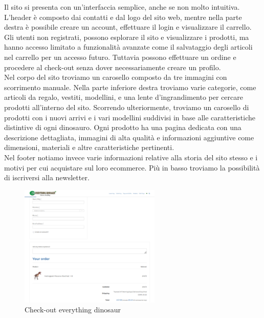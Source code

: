 Il sito si presenta con un'interfaccia semplice, anche se non molto intuitiva. L'header è composto dai contatti e dal logo del sito web, mentre nella parte destra è possibile creare un account, effettuare il login e visualizzare il carrello. Gli utenti non registrati, possono esplorare il sito e visualizzare i prodotti, ma hanno accesso limitato a funzionalità avanzate come il salvataggio degli articoli nel carrello per un accesso futuro. Tuttavia possono effettuare un ordine e procedere al check-out senza dover necessariamente creare un profilo.
\\
Nel corpo del sito troviamo un carosello composto da tre immagini con scorrimento manuale. Nella parte inferiore destra troviamo varie categorie, come articoli da regalo, vestiti, modellini, e una lente d'ingrandimento per cercare prodotti all'interno del sito. Scorrendo ulteriormente, troviamo un carosello di prodotti con i nuovi arrivi e i vari modellini suddivisi in base alle caratteristiche distintive di ogni dinosauro. Ogni prodotto ha una pagina dedicata con una descrizione dettagliata, immagini di alta qualità e informazioni aggiuntive come dimensioni, materiali e altre caratteristiche pertinenti. 
\\
Nel footer notiamo invece varie informazioni relative alla storia del sito stesso e i motivi per cui acquistare sul loro ecommerce. Più in basso troviamo la possibilità di iscriversi alla newsletter. 

\begin{figure}[H]
        \centering
        \includegraphics[width=0.60\textwidth]{immagini/everything_dinosaur_checkout.png}
        \caption{Check-out everything dinosaur}
    \end{figure}
